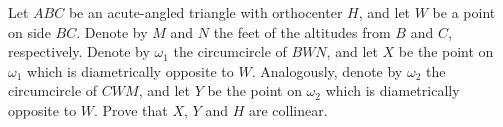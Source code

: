 Let $ABC$ be an acute-angled triangle with orthocenter $H$, and let $W$ be a point on side $BC$. Denote by $M$ and $N$ the feet of the altitudes from $B$ and $C$, respectively. Denote by $\omega_1$ the circumcircle of $BWN$, and let $X$ be the point on $\omega_1$ which is diametrically opposite to $W$. Analogously, denote by $\omega_2$ the circumcircle of $CWM$, and let $Y$ be the point on $\omega_2$ which is diametrically opposite to $W$. Prove that $X$, $Y$ and $H$ are collinear.
